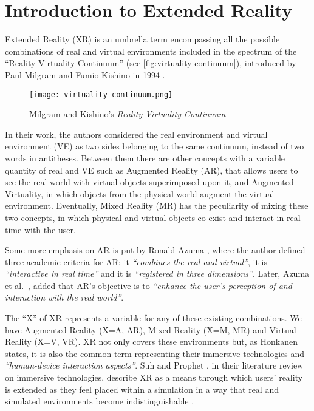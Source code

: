 \section{Introduction to Extended Reality}
\label{sec:background-intro}

Extended Reality (XR) is an umbrella term encompassing all the possible combinations of real and virtual environments included in the spectrum of the “Reality-Virtuality Continuum” (see \autoref{fig:virtuality-continuum}), introduced by Paul Milgram and Fumio Kishino in 1994 \cite{milgram_taxonomy_1994}.

\begin{figure}[h]
	\centering
	\texttt{[image: virtuality-continuum.png]}
	\caption{Milgram and Kishino's \textit{Reality-Virtuality Continuum}}
	\label{fig:virtuality-continuum}
\end{figure}
In their work, the authors considered the real environment and virtual environment (VE) as two sides belonging to the same continuum, instead of two words in antitheses. Between them there are other concepts with a variable quantity of real and VE such as Augmented Reality (AR), that allows users to see the real world with virtual objects superimposed upon it, and Augmented Virtuality, in which objects from the physical world augment the virtual environment. Eventually, Mixed Reality (MR) has the peculiarity of mixing these two concepts, in which physical and virtual objects co-exist and interact in real time with the user.

Some more emphasis on AR is put by Ronald Azuma \cite{azuma_survey_1997}, where the author defined three academic criteria for AR: it \textit{“combines the real and virtual”}, it is \textit{“interactive in real time”} and it is \textit{“registered in three dimensions”}. Later, Azuma et al.~\cite{azuma_advances_2001}, added that AR's objective is to \textit{“enhance the user’s perception of and interaction with the real world”}.

The “X” of XR represents a variable for any of these existing combinations. We have Augmented Reality (X=A, AR), Mixed Reality (X=M, MR) and Virtual Reality (X=V, VR). XR not only covers these environments but, as Honkanen \cite{honkanen_enhancing_2018} states, it is also the common term representing their immersive technologies and \textit{“human-device interaction aspects”}. Suh and Prophet \cite{suh_prophet_2018}, in their literature review on immersive technologies, describe XR as a means through which users' reality is extended as they feel placed within a simulation in a way that real and simulated environments become indistinguishable \cite{kwok_covid-19_2020}.


